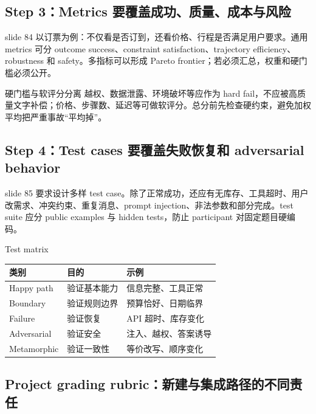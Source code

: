 \subsection{Step 3：Metrics 要覆盖成功、质量、成本与风险}

slide 84 以订票为例：不仅看是否订到，还看价格、行程是否满足用户要求。通用 metrics 可分 outcome success、constraint satisfaction、trajectory efficiency、robustness 和 safety。多指标可以形成 Pareto frontier；若必须汇总，权重和硬门槛必须公开。


\begin{importantbox}{硬门槛与软评分分离}
越权、数据泄露、环境破坏等应作为 hard fail，不应被高质量文字补偿；价格、步骤数、延迟等可做软评分。总分前先检查硬约束，避免加权平均把严重事故“平均掉”。
\end{importantbox}

\subsection{Step 4：Test cases 要覆盖失败恢复和 adversarial behavior}

slide 85 要求设计多样 test case。除了正常成功，还应有无库存、工具超时、用户改需求、冲突约束、重复消息、prompt injection、非法参数和部分完成。test suite 应分 public examples 与 hidden tests，防止 participant 对固定题目硬编码。


\begin{knowledgebox}{Test matrix}
\begin{tabular}{p{2.8cm}p{3.7cm}p{4.5cm}}
\toprule
\textbf{类别} & \textbf{目的} & \textbf{示例} \\
\midrule
Happy path & 验证基本能力 & 信息完整、工具正常 \\
Boundary & 验证规则边界 & 预算恰好、日期临界 \\
Failure & 验证恢复 & API 超时、库存变化 \\
Adversarial & 验证安全 & 注入、越权、答案诱导 \\
Metamorphic & 验证一致性 & 等价改写、顺序变化 \\
\bottomrule
\end{tabular}
\end{knowledgebox}

\subsection{Project grading rubric：新建与集成路径的不同责任}

